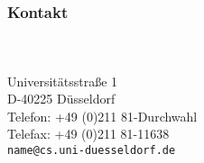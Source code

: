 \section*{}

\begin{frame}
  \frametitle{Kontakt}
  \vfill
  \textcolor{hhuUniBlau}{\bf \insertauthor}\\[3mm]
  \scriptsize
  \insertinstitute\\
  Universitätsstraße 1\\
  D-40225 Düsseldorf\\[2mm]
  Telefon: +49 (0)211 81-Durchwahl\\
  Telefax: +49 (0)211 81-11638\\[2mm]
  \texttt{name@cs.uni-duesseldorf.de}
\end{frame}
